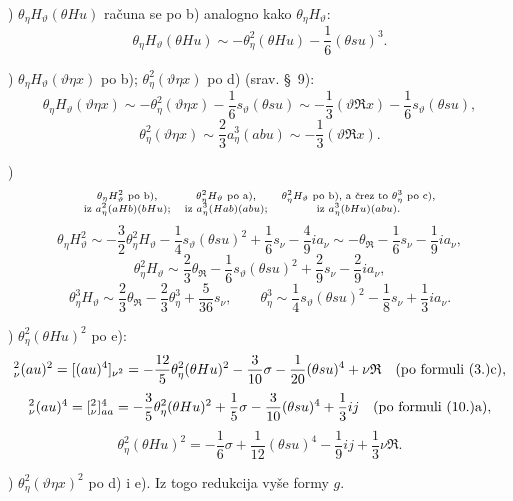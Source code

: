 \documentclass[11pt]{article}
\let\A\relax
\newcommand{\A}{\mathfrak A}
\newcommand{\R}{\mathfrak R}
\begin{document}
) $\theta_\eta H_\vartheta(\theta Hu)$ računa se po \mbox{b)} analogno kako $\theta_\eta H_\vartheta$:
\[
\theta_\eta H_\vartheta(\theta Hu)\sim-\theta_\eta^2(\theta Hu)-\frac16(\theta su)^3.
\]

) $\theta_\eta H_\vartheta(\vartheta\eta x)$ po \mbox{b)}; $\theta_\eta^2(\vartheta\eta x)$ po \mbox{d)} (srav. \S\ 9):
\[
\theta_\eta H_\vartheta(\vartheta\eta x)\sim-\theta_\eta^2(\vartheta\eta x)-\frac16s_\vartheta(\theta su)
\sim-\frac13(\vartheta\R x)-\frac16s_\vartheta(\theta su),
\]
\[
\theta_\eta^2(\vartheta\eta x)\sim\frac23a_\eta^3(abu)\sim-\frac13(\vartheta\R x).
\]

)
\[
\scriptsize
\begin{array}{ccc}
\theta_\eta H_\vartheta^2\text{ po } \mathrm{b)},&
\theta_\eta^2H_\vartheta\text{ po } \mathrm{a)},&
\theta_\eta^2H_\vartheta\text{ po } \mathrm{b)}\text{, a črez to }\theta_\eta^3\text{ po } \mathrm{c)},\\
\text{iz }a_\eta^2(aHb)(bHu);&
\text{iz }a_\eta^3(Hab)(abu);&
\text{iz }a_\eta^3(bHu)(abu).
\end{array}
\]
\[
\theta_\eta H_\vartheta^2\sim-\frac32\theta_\eta^2H_\vartheta-\frac14s_\vartheta(\theta su)^2+\frac16s_\nu-\frac49ia_\nu
\sim-\theta_\R-\frac16s_\nu-\frac19ia_\nu,
\]
\[
\theta_\eta^2H_\vartheta\sim\frac23\theta_\R-\frac16s_\vartheta(\theta su)^2+\frac29s_\nu-\frac29ia_\nu,
\]
\[
\theta_\eta^3H_\vartheta\sim\frac23\theta_\R-\frac23\theta_\eta^3+\frac5{36}s_\nu,
\qquad
\theta_\eta^3\sim\frac14s_\vartheta(\theta su)^2-\frac18s_\nu+\frac13ia_\nu.
\]

) $\theta_\eta^2(\theta Hu)^2$ po \mbox{e)}:
\begingroup\small
\[
\A_\nu^2(a\A u)^2=[(a\A u)^4]_{\nu^2}
=-\frac{12}{5}\theta_\eta^2(\theta Hu)^2-\frac3{10}\sigma-\frac1{20}(\theta su)^4+\nu\R
\quad(\text{po formuli (3.)}\mathrm{c}),
\]
\[
\A_\nu^2(a\A u)^4=[\A_\nu^2]_{aa}^4=-\frac35\theta_\eta^2(\theta Hu)^2+\frac15\sigma-\frac3{10}(\theta su)^4+\frac13ij
\quad(\text{po formuli (10.)}\mathrm{a}),
\]
\endgroup
\[
\theta_\eta^2(\theta Hu)^2=-\frac16\sigma+\frac1{12}(\theta su)^4-\frac19ij+\frac13\nu\R.
\]

) $\theta_\eta^2(\vartheta\eta x)^2$ po \mbox{d)} i \mbox{e)}. Iz togo redukcija vyše formy $g$.
\end{document}
